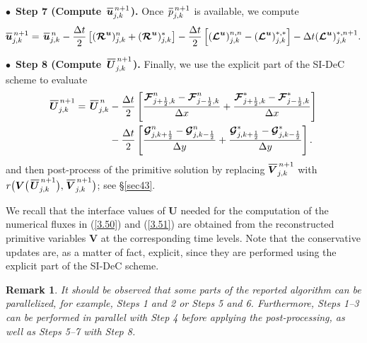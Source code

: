 \documentclass[preprint,12pt]{elsarticle}
\newtheorem{remark}{Remark}[section]
\newcommand{\dt}{\Delta t}
\newcommand{\dx}{\Delta x}
\newcommand{\dy}{\Delta y}
\newcommand{\kph}{{k+\frac{1}{2}}}
\newcommand{\kmh}{{k-\frac{1}{2}}}
\newcommand{\jph}{{j+\frac{1}{2}}}
\newcommand{\jmh}{{j-\frac{1}{2}}}
\newcommand\eref[1]{(\ref{#1})}
\newcommand*\xbar[1]{%
	\hbox{%
		\vbox{%
			\hrule height 0.5pt %
			\kern0.4ex%
			\hbox{%
				\kern-0.05em%
				\ensuremath{#1}%
				\kern-0.00em%
			}%
		}%
	}%
}
\newcommand{\uvec}[2][3]{\boldsymbol{#2\mkern-#1mu}\mkern#1mu}
\begin{document}
\smallskip
\noindent
$\bullet\,$ \textbf{Step 7 (Compute $\,\xbar{\bm u}^{\,n+1}_{j,k}$).} Once $\,\xbar p^{\,n+1}_{j,k}$ is available, we compute
\begin{equation*}
	\begin{aligned}
		\xbar{\bm u}^{\,n+1}_{j,k}=
		\,\xbar{\bm u}^{\,n}_{j,k}-\frac{\dt}{2}\left[(\bm{{\cal R}}^{\bm u})^n_{j,k}+(\bm{{\cal R}}^{\bm u})^*_{j,k}\right]
		-\frac{\dt}{2}\left[(\bm{{\cal L}}^{\uvec{u}})^{n,n}_{j,k}
		-(\bm{{\cal L}}^{\uvec{u}})^{*,*}_{j,k}\right]-\dt(\bm{{\cal L}}^{\bm u})^{*,n+1}_{j,k}.
	\end{aligned}
\end{equation*}

\smallskip
\noindent
$\bullet\,$ \textbf{Step 8 (Compute $\,\xbar{\bm U}^{\,n+1}_{j,k}$).} Finally, we use the explicit part of the SI-DeC scheme to evaluate  
\begin{equation}
	\begin{aligned}
		\xbar{\bm U}^{\,n+1}_{j,k}=\,\xbar{\bm U}^{\,n}_{j,k}&-\frac{\dt}{2}\left[\frac{\bm{{\cal F}}_{\jph,k}^n-\bm{{\cal F}}_{\jmh,k}^n}{\dx}+
		\frac{\bm{{\cal F}}_{\jph,k}^{*}-\bm{{\cal F}}_{\jmh,k}^{*}}{\dx}\right]\\
		&-\frac{\dt}{2}\left[\frac{\bm{{\cal G}}_{j,\kph}^n-\bm{{\cal G}}_{j,\kmh}^n}{\dy}+
		\frac{\bm{{\cal G}}_{j,\kph}^{*}-\bm{{\cal G}}_{j,\kmh}^{*}}{\dy}\right].
	\end{aligned}
	\label{3.51}
\end{equation}
and then post-process of the primitive solution by replacing $\xbar{\bm V}^{\,n+1}_{j,k}$ with
$r\big(\bm V\big(\,\xbar{\bm U}^{\,n+1}_{j,k}\big),\,\xbar{\bm V}^{\,n+1}_{j,k}\big)$; see \S\ref{sec43}.

We recall that the interface values of $\bm U$ needed for the computation of the numerical fluxes in \eref{3.50} and \eref{3.51} are
obtained from the reconstructed primitive variables $\bm V$ at the corresponding time levels. Note that the conservative updates are, as a
matter of fact, explicit, since they are performed using the explicit part of the SI-DeC scheme.

{\color{black}
	\begin{remark}
		It should be observed that some parts of the reported algorithm can be parallelized, for example, Steps 1 and 2 or Steps 5 and 6.
		Furthermore, Steps 1--3 can be performed in parallel with Step 4 before applying the post-processing, as well as Steps 5--7 with Step 8.
\end{remark}}
\end{document}

